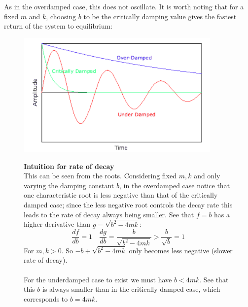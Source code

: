 \documentclass{report}
\begin{document}
As in the overdamped case, this does not oscillate. It is worth noting that for a fixed $m$ and $k$, choosing $b$
to be the critically damping value gives the fastest return of the system to equilibrium:
\begin{figure}[h]
\begin{center}
\includegraphics[width=10cm]{29}\\
\end{center}
\textbf{Intuition for rate of decay}\\
This can be seen from the roots. Considering fixed $m,k$ and only varying the damping constant $b$, 
in the overdamped case notice that one characteristic root is less negative than that of the 
critically damped case; since the less negative root controls the decay rate this leads to the rate of decay always
being smaller. See that $f=b$ has a higher derivative than
$g=\sqrt{b^2-4mk}$:
\begin{equation*}
\frac{df}{db}=1\quad\frac{dg}{db}=\frac{b}{\sqrt{b^2-4mk}}
>\frac{b}{\sqrt{b}}=1
\end{equation*}
For $m,k>0$. So $-b+\sqrt{b^2-4mk}$ only becomes less negative (slower rate of decay).\\
\vspace{1mm}\\
For the underdamped case to exist we must have $b<4mk$. See that this $b$ is always smaller than in the critically
damped case, which corresponds to $b=4mk$.
\end{figure}
\newpage
\end{document}
